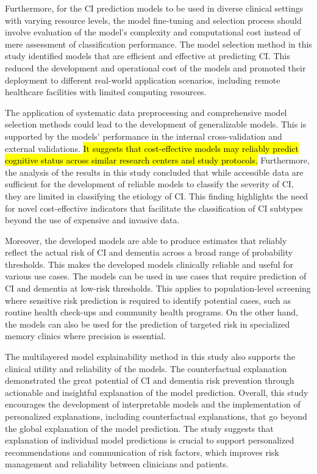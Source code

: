 Furthermore, for the CI prediction models to be used in diverse clinical settings with varying resource levels, the model fine-tuning and selection process should involve evaluation of the model's complexity and computational cost instead of mere assessment of classification performance. The model selection method in this study identified models that are efficient and effective at predicting CI. This reduced the development and operational cost of the models and promoted their deployment to different real-world application scenarios, including remote healthcare facilities with limited computing resources.

The application of systematic data preprocessing and comprehensive model selection methods could lead to the development of generalizable models. This is supported by the models' performance in the internal cross-validation and external validations. \hl{It suggests that cost-effective models may reliably predict cognitive status across similar research centers and study protocols.} Furthermore, the analysis of the results in this study concluded that while accessible data are sufficient for the development of reliable models to classify the severity of CI, they are limited in classifying the etiology of CI. This finding highlights the need for novel cost-effective indicators that facilitate the classification of CI subtypes beyond the use of expensive and invasive data.

Moreover, the developed models are able to produce estimates that reliably reflect the actual risk of CI and dementia across a broad range of probability thresholds. This makes the developed models clinically reliable and useful for various use cases. The models can be used in use cases that require prediction of CI and dementia at low-risk thresholds. This applies to population-level screening where sensitive risk prediction is required to identify potential cases, such as routine health check-ups and community health programs. On the other hand, the models can also be used for the prediction of targeted risk in specialized memory clinics where precision is essential.

The multilayered model explainability method in this study also supports the clinical utility and reliability of the models. The counterfactual explanation demonstrated the great potential of CI and dementia risk prevention through actionable and insightful explanation of the model prediction. Overall, this study encourages the development of interpretable models and the implementation of personalized explanations, including counterfactual explanations, that go beyond the global explanation of the model prediction. The study suggests that explanation of individual model predictions is crucial to support personalized recommendations and communication of risk factors, which improves risk management and reliability between clinicians and patients.

